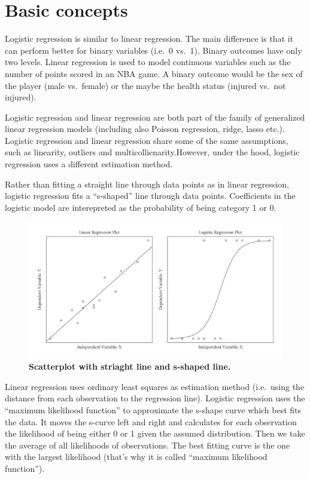 \documentclass[
]{book}
\begin{document}
\hypertarget{basic-concepts}{%
\section{Basic concepts}\label{basic-concepts}}

Logistic regression is similar to linear regression. The main difference is that
it can perform better for binary variables (i.e.~0 vs.~1). Binary outcomes have
only two levels. Linear regression is used to model continuous variables such as the number of points scored in an NBA game. A binary outcome would be the sex of the player (male vs.~female) or the maybe the health status (injured vs.~not injured).

Logistic regression and linear regression are both part of the family of
generalized linear regression models (including also Poisson regression, ridge, lasso etc.).
Logistic regression and linear regression share some of the same assumptions, such
as linearity, outliers and multicollienarity.However, under the hood, logistic
regression uses a different estimation method.

Rather than fitting a straight line through data points as in linear regression,
logistic regression fits a ``s-shaped'' line through data points. Coefficients in
the logistic model are interepreted as the probability of being category 1 or 0.

\begin{figure}
\centering
\includegraphics{linear-vs-logistic.png}
\caption{\textbf{Scatterplot with striaght line and s-shaped line.}}
\end{figure}

Linear regression uses ordinary least squares as estimation method (i.e.~using the distance from each observation to the regression line). Logistic regression uses the ``maximum likelihood function'' to approximate the s-shape curve which best fits the data. It moves the s-curve left and right and
calculates for each observation the likelihood of being either 0 or 1 given the assumed distribution. Then we take the average of all likelihoods of observations. The best fitting
curve is the one with the largest likelihood (that's why it is called ``maximum likelihood function'').
\end{document}
